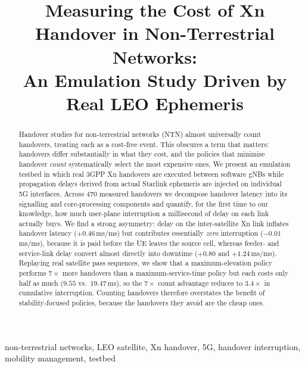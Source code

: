 \documentclass[conference]{IEEEtran}
\begin{document}
\title{Measuring the Cost of Xn Handover in Non-Terrestrial Networks:\\
An Emulation Study Driven by Real LEO Ephemeris}

\author{
}

\maketitle

\begin{abstract}
Handover studies for non-terrestrial networks (NTN) almost universally count
handovers, treating each as a cost-free event. This obscures a term that
matters: handovers differ substantially in what they cost, and the policies
that minimise handover \emph{count} systematically select the most expensive
ones. We present an emulation testbed in which real 3GPP Xn handovers are
executed between software gNBs while propagation delays derived from actual
Starlink ephemeris are injected on individual 5G interfaces. Across 470 measured
handovers we decompose handover latency into its signalling and core-processing
components and quantify, for the first time to our knowledge, how much
user-plane interruption a millisecond of delay on each link actually buys.
We find a strong asymmetry: delay on the inter-satellite Xn link inflates
handover latency ($+0.46$\,ms/ms) but contributes essentially \emph{zero}
interruption ($-0.01$\,ms/ms), because it is paid before the UE leaves the
source cell, whereas feeder- and service-link delay convert almost directly into
downtime ($+0.80$ and $+1.24$\,ms/ms). Replaying real satellite pass sequences,
we show that a maximum-elevation policy performs $7\times$ more handovers than a
maximum-service-time policy but each costs only half as much
($9.55$ vs.\ $19.47$\,ms), so the $7\times$ count advantage reduces to
$3.4\times$ in cumulative interruption. Counting handovers therefore overstates
the benefit of stability-focused policies, because the handovers they avoid are
the cheap ones.
\end{abstract}

\begin{IEEEkeywords}
non-terrestrial networks, LEO satellite, Xn handover, 5G, handover
interruption, mobility management, testbed
\end{IEEEkeywords}
\end{document}
